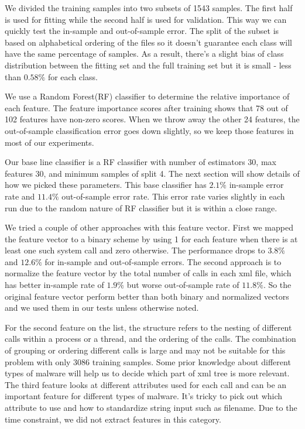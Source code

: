 \documentclass[submit]{harvardml}
\begin{document}
We divided the training samples into two subsets of 1543 samples. The first half is used for fitting while the second half is used for validation. This way we can quickly test the in-sample and out-of-sample error. The split of the subset is based on alphabetical ordering of the files so it doesn't guarantee each class will have the same percentage of samples. As a result, there's a slight bias of class distribution between the fitting set and the full training set but it is small - less than $0.58\%$ for each class.

We use a Random Forest(RF) classifier to determine the relative importance of each feature. The feature importance scores after training shows that 78 out of 102 features have non-zero scores. When we throw away the other 24 features, the out-of-sample classification error goes down slightly, so we keep those features in most of our experiments.

Our base line classifier is a RF classifier with number of estimators 30, max features 30, and minimum samples of split 4. The next section will show details of how we picked these parameters. This base classifier has $2.1\%$ in-sample error rate and $11.4\%$ out-of-sample error rate. This error rate varies slightly in each run due to the random nature of RF classifier but it is within a close range.

We tried a couple of other approaches with this feature vector. First we mapped the feature vector to a binary scheme by using 1 for each feature when there is at least one such system call and zero otherwise. The performance drops to $3.8\%$ and $12.6\%$ for in-sample and out-of-sample errors. The second approach is to normalize the feature vector by the total number of calls in each xml file, which has better in-sample rate of $1.9\%$ but worse out-of-sample rate of $11.8\%$. So the original feature vector perform better than both binary and normalized vectors and we used them in our tests unless otherwise noted.

For the second feature on the list, the structure refers to the nesting of different calls within a process or a thread, and the ordering of the calls. The combination of grouping or ordering different calls is large and may not be suitable for this problem with only 3086 training samples. Some prior knowledge about different types of malware will help us to decide which part of xml tree is more relevant. The third feature looks at different attributes used for each call and can be an important feature for different types of malware. It's tricky to pick out which attribute to use and how to standardize string input such as filename. Due to the time constraint, we did not extract features in this category.
\end{document}
